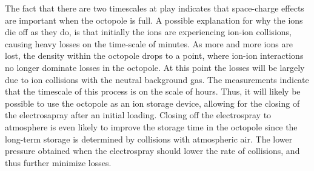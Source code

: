 The fact that there are two timescales at play indicates that space-charge effects are important when the octopole is full. A possible explanation for why the ions die off as they do, is that initially the ions are experiencing ion-ion collisions, causing heavy losses on the time-scale of minutes.
As more and more ions are lost, the density within the octopole drops to a point, where ion-ion interactions no longer dominate losses in the octopole.
At this point the losses will be largely due to ion collisions with the neutral background gas. The measurements indicate that the timescale of this process is on the scale of hours.
Thus, it will likely be possible to use the octopole as an ion storage device, allowing for the closing of the electrosapray after an initial loading.
Closing off the electrospray to atmosphere is even likely to improve the storage time in the octopole since the long-term storage is determined by collisions with atmospheric air. The lower pressure obtained when the electrospray should lower the rate of collisions, and thus further minimize losses.